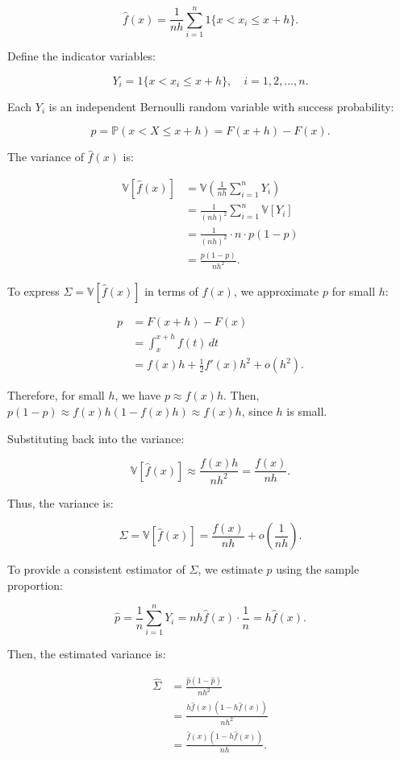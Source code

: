\documentclass{article}
\begin{document}
\[
\hat{f}(x) = \frac{1}{n h} \sum_{i=1}^n 1\{ x < x_i \leq x + h \}.
\]

Define the indicator variables:

\[
Y_i = 1\{ x < x_i \leq x + h \}, \quad i = 1, 2, \dots, n.
\]

Each \( Y_i \) is an independent Bernoulli random variable with success probability:

\[
p = \mathbb{P}(x < X \leq x + h) = F(x + h) - F(x).
\]

The variance of \( \hat{f}(x) \) is:

\[
\begin{aligned}
\mathbb{V}[\hat{f}(x)] &= \mathbb{V}\left( \frac{1}{n h} \sum_{i=1}^n Y_i \right) \\
&= \frac{1}{(n h)^2} \sum_{i=1}^n \mathbb{V}[Y_i] \\
&= \frac{1}{(n h)^2} \cdot n \cdot p (1 - p) \\
&= \frac{p (1 - p)}{n h^2}.
\end{aligned}
\]

To express \( \Sigma = \mathbb{V}[\hat{f}(x)] \) in terms of \( f(x) \), we approximate \( p \) for small \( h \):

\[
\begin{aligned}
p &= F(x + h) - F(x) \\
&= \int_x^{x + h} f(t) \, dt \\
&= f(x) h + \frac{1}{2} f'(x) h^2 + o(h^2).
\end{aligned}
\]

Therefore, for small \( h \), we have \( p \approx f(x) h \). Then, \( p (1 - p) \approx f(x) h (1 - f(x) h) \approx f(x) h \), since \( h \) is small.

Substituting back into the variance:

\[
\mathbb{V}[\hat{f}(x)] \approx \frac{f(x) h}{n h^2} = \frac{f(x)}{n h}.
\]

Thus, the variance is:

\[
\Sigma = \mathbb{V}[\hat{f}(x)] = \frac{f(x)}{n h} + o\left( \frac{1}{n h} \right).
\]

To provide a consistent estimator of \( \Sigma \), we estimate \( p \) using the sample proportion:

\[
\hat{p} = \frac{1}{n} \sum_{i=1}^n Y_i = n h \hat{f}(x) \cdot \frac{1}{n} = h \hat{f}(x).
\]

Then, the estimated variance is:

\[
\begin{aligned}
\hat{\Sigma} &= \frac{\hat{p} (1 - \hat{p})}{n h^2} \\
&= \frac{h \hat{f}(x) \left( 1 - h \hat{f}(x) \right)}{n h^2} \\
&= \frac{\hat{f}(x) \left( 1 - h \hat{f}(x) \right)}{n h}.
\end{aligned}
\]
\end{document}
